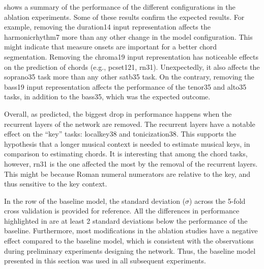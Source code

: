 

 shows a summary of the performance of the
different configurations in the ablation experiments. Some
of these results confirm the expected results. For example,
removing the \gls{duration14} input representation affects
the \gls{harmonicrhythm7} more than any other change in the
model configuration. This might indicate that measure onsets
are important for a better chord segmentation. Removing the
\gls{chroma19} input representation has noticeable effects
on the prediction of chords (e.g., \gls{pcset121},
\gls{rn31}). Unexpectedly, it also affects the
\gls{soprano35} task more than any other \gls{satb35} task.
On the contrary, removing the \gls{bass19} input
representation affects the performance of the \gls{tenor35}
and \gls{alto35} tasks, in addition to the \gls{bass35},
which was the expected outcome.

Overall, as predicted, the biggest drop in performance
happens when the recurrent layers of the network are
removed. The recurrent layers have a notable effect on the
``key'' tasks: \gls{localkey38} and \gls{tonicization38}.
This supports the hypothesis that a longer musical context
is needed to estimate musical keys, in comparison to
estimating chords. It is interesting that among the chord
tasks, however, \gls{rn31} is the one affected the most by
the removal of the recurrent layers. This might be because
Roman numeral numerators are relative to the key, and thus
sensitive to the key context.

In the row of the baseline model, the standard deviation
($\sigma$) across the 5-fold cross validation is provided
for reference. All the differences in performance
highlighted in  are at least 2 standard
deviations below the performance of the baseline. 
Furthermore, most modifications in the ablation studies have
a negative effect compared to the baseline model, which is
consistent with the observations during preliminary
experiments designing the network. 
Thus, the baseline model presented in this section was used
in all subsequent experiments.
